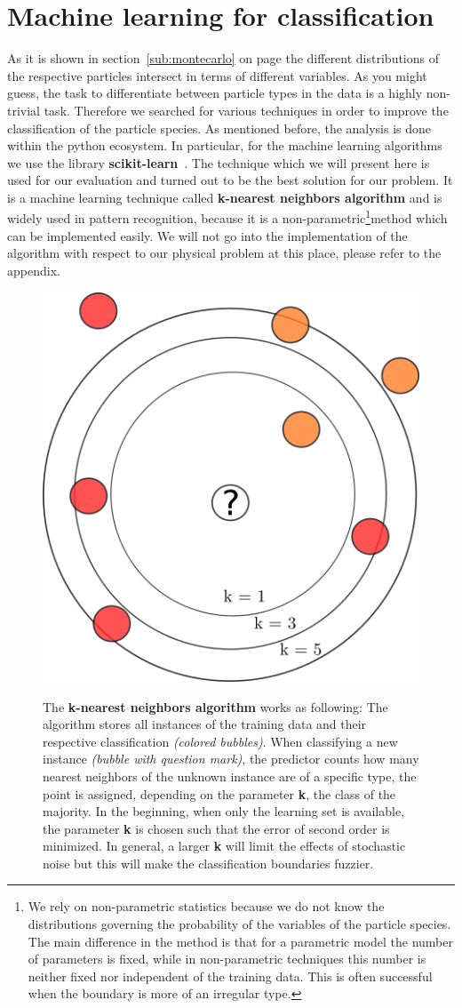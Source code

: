 \newpage
\section{Machine learning for classification}
As it is shown in section~\ref{sub:montecarlo} on page \pageref{sub:montecarlo} 
the different distributions of the respective particles intersect in terms of different
variables. As you might guess, the task to differentiate between particle types in the 
data is a highly non-trivial task. Therefore we searched for various techniques in order
to improve the classification of the particle species. 
As mentioned before, the analysis is done within the python
ecosystem. In particular, for the machine learning algorithms we use the library 
\textbf{scikit-learn}~\cite{scikit-learn}. 
The technique which we will present
here is used for our evaluation and turned out to be the best solution for our problem.
It is a machine learning technique called \textbf{k-nearest neighbors algorithm} and
is widely used in pattern recognition, because it is a non-parametric\footnote{
We rely on non-parametric statistics because we do not know the distributions governing
the probability of the variables of the particle species. 
The main difference in the method is that for a parametric model
the number of parameters is fixed, while in non-parametric techniques this number is 
neither fixed nor independent of the training data. This is often successful when the boundary is 
more of an irregular type.
}method which can
be implemented easily. We will not go into the implementation of the algorithm with respect to our physical problem at this
place, please refer to the appendix.
\begin{figure}
    \centering
    \caption{The \textbf{k-nearest neighbors algorithm} works as following: 
        The algorithm stores all instances of the training data and their respective
    classification \textit{(colored bubbles)}. When classifying a new instance \textit{(bubble with question mark)}, the 
    predictor counts how many nearest neighbors of the unknown instance are of a specific type, the point is assigned, 
    depending on the parameter \textbf{k}, the class of the majority. In the beginning, when only the learning set is available,
    the parameter \textbf{k} is chosen such that the error of second order is minimized. In general, a larger \textbf{k} will
    limit the effects of stochastic noise but this will make the classification boundaries fuzzier.}
    \includegraphics[width=0.5\linewidth]{figures/knn_schema}
\label{fig:knn_schema}
\end{figure}

